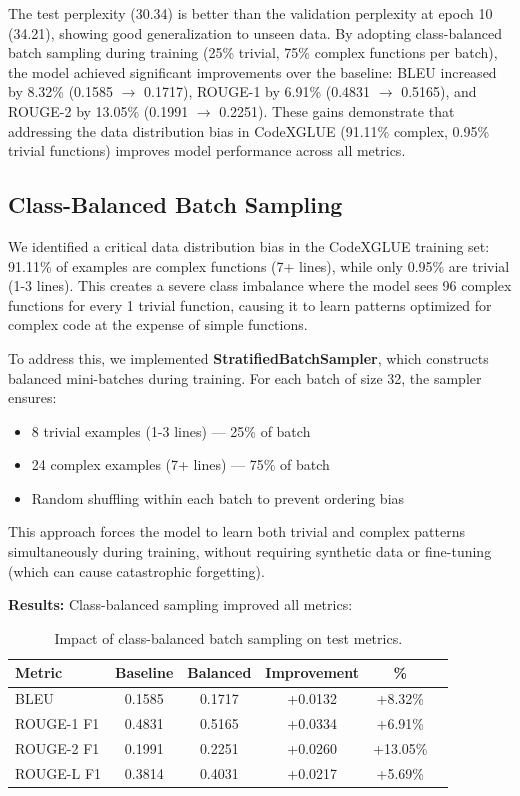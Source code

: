 \documentclass[11pt]{article}
\begin{document}
The test perplexity (30.34) is better than the validation perplexity at epoch 10 (34.21), showing good generalization to unseen data. By adopting class-balanced batch sampling during training (25\% trivial, 75\% complex functions per batch), the model achieved significant improvements over the baseline: BLEU increased by 8.32\% (0.1585 $\rightarrow$ 0.1717), ROUGE-1 by 6.91\% (0.4831 $\rightarrow$ 0.5165), and ROUGE-2 by 13.05\% (0.1991 $\rightarrow$ 0.2251). These gains demonstrate that addressing the data distribution bias in CodeXGLUE (91.11\% complex, 0.95\% trivial functions) improves model performance across all metrics.

\subsection{Class-Balanced Batch Sampling}

We identified a critical data distribution bias in the CodeXGLUE training set: 91.11\% of examples are complex functions (7+ lines), while only 0.95\% are trivial (1-3 lines). This creates a severe class imbalance where the model sees 96 complex functions for every 1 trivial function, causing it to learn patterns optimized for complex code at the expense of simple functions.

To address this, we implemented \textbf{StratifiedBatchSampler}, which constructs balanced mini-batches during training. For each batch of size 32, the sampler ensures:
\begin{itemize}
\item 8 trivial examples (1-3 lines) — 25\% of batch
\item 24 complex examples (7+ lines) — 75\% of batch
\item Random shuffling within each batch to prevent ordering bias
\end{itemize}

This approach forces the model to learn both trivial and complex patterns simultaneously during training, without requiring synthetic data or fine-tuning (which can cause catastrophic forgetting).

\textbf{Results:} Class-balanced sampling improved all metrics:
\begin{table}[h]
\centering
\begin{tabular}{@{}lccccc@{}}
\toprule
\textbf{Metric} & \textbf{Baseline} & \textbf{Balanced} & \textbf{Improvement} & \textbf{\%} \\
\midrule
BLEU & 0.1585 & 0.1717 & +0.0132 & +8.32\% \\
ROUGE-1 F1 & 0.4831 & 0.5165 & +0.0334 & +6.91\% \\
ROUGE-2 F1 & 0.1991 & 0.2251 & +0.0260 & +13.05\% \\
ROUGE-L F1 & 0.3814 & 0.4031 & +0.0217 & +5.69\% \\
\bottomrule
\end{tabular}
\caption{Impact of class-balanced batch sampling on test metrics.}
\end{table}
\end{document}
